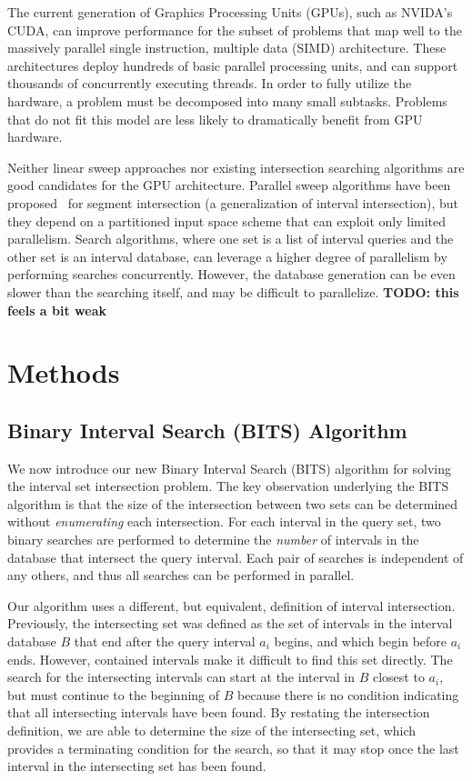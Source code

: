 \documentclass{bioinfo}
\begin{document}
	The current generation of Graphics Processing Units (GPUs), such as NVIDA's
	CUDA, can improve performance for the subset of problems that map well to the
	massively parallel single instruction, multiple data (SIMD) architecture.  These
	architectures deploy hundreds of basic parallel processing units, and can
	support thousands of concurrently executing threads.  In order to fully utilize
	the hardware, a problem must be decomposed into many small subtasks.   Problems
	that do not fit this model are less likely to dramatically benefit from GPU
	hardware.
	
	Neither linear sweep approaches nor existing intersection searching algorithms are good
	candidates for the GPU architecture.  Parallel sweep algorithms have been
	proposed~\citep{goodrich1993, kriegel1991, mckenney2009} for segment
	intersection (a generalization of interval intersection), but they depend on a
	partitioned input space scheme that can exploit only limited parallelism.
	Search algorithms, where one set is a list of interval queries and the other set
	is an interval database, can leverage a higher degree of parallelism by
	performing searches concurrently.  However, the database generation can be even
	slower than the searching itself, and may be difficult to parallelize. 
	\textbf{TODO: this feels a bit weak}

	
	\section{Methods}
	\subsection{Binary Interval Search (BITS) Algorithm}
	We now introduce our new Binary Interval Search (BITS) algorithm for solving
	the interval set intersection problem.  The key observation underlying the BITS 
	algorithm is that the size of the intersection between two sets can be 
	determined without \emph{enumerating} each intersection.  For each interval 
	in the query set, two binary searches are performed to determine the \emph{number} 
	of intervals in the database that intersect the query interval.  Each pair of
	searches is independent of any others, and thus all searches can be
	performed in parallel.  
	
	Our algorithm uses a different, but equivalent, definition of interval
	intersection.  Previously, the intersecting set was defined as the set
	of intervals in the interval database $B$ that end after the query
	interval $a_i$ begins, and which begin before $a_i$ ends.  However,
	contained intervals make it difficult to find this set directly.  The
	search for the intersecting intervals can start at the interval in $B$
	closest to $a_i$, but must continue to the beginning of $B$ because
	there is no condition indicating that all intersecting intervals have
	been found.  By restating the intersection definition, we are able to
	determine the size of the intersecting set, which provides a
	terminating condition for the search, so that it may stop once the
	last interval in the intersecting set has been found.
\end{document}
